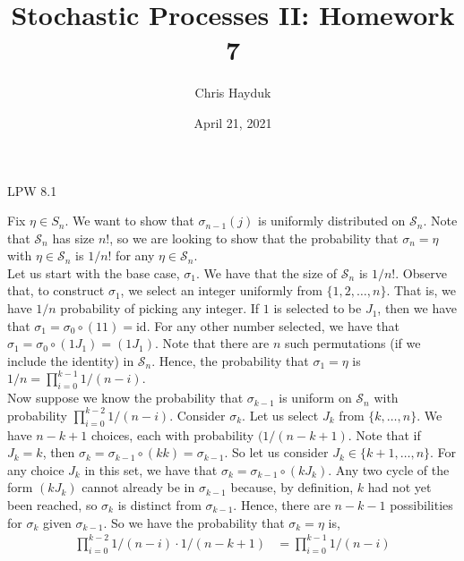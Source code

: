 \documentclass[12pt]{article}
\newenvironment{problem}[2][Problem]{\begin{trivlist}
\item[\hskip \labelsep {\bfseries #1}\hskip \labelsep {\bfseries #2.}]}{\end{trivlist}}
\begin{document}
\title{Stochastic Processes II: Homework 7}

\author{Chris Hayduk}
\date{April 21, 2021}

\maketitle

\begin{problem}{I}
LPW 8.1
\end{problem}


Fix $\eta \in S_n$. We want to show that $\sigma_{n-1}(j)$ is uniformly distributed on $\mathcal{S}_n$. Note that $\mathcal{S}_n$ has size $n!$, so we are looking to show that the probability that $\sigma_{n} = \eta$ with $\eta \in \mathcal{S}_n$ is $1/n!$ for any $\eta \in \mathcal{S}_n$.\\

Let us start with the base case, $\sigma_1$. We have that the size of $\mathcal{S}_n$ is $1/n!$. Observe that, to construct $\sigma_1$, we select an integer uniformly from $\{1, 2, \ldots, n\}$. That is, we have $1/n$ probability of picking any integer. If $1$ is selected to be $J_1$, then we have that $\sigma_1 = \sigma_0 \circ (11) = \text{id}$. For any other number selected, we have that $\sigma_1 = \sigma_0 \circ (1 J_1) = (1 J_1)$. Note that there are $n$ such permutations (if we include the identity) in $\mathcal{S}_n$. Hence, the probability that $\sigma_1 = \eta$ is $1/n = \prod_{i=0}^{k-1} 1/(n-i)$.\\

Now suppose we know the probability that $\sigma_{k-1}$ is uniform on $\mathcal{S}_{n}$ with probability $\prod_{i=0}^{k-2} 1/(n-i)$. Consider $\sigma_k$. Let us select $J_k$ from $\{k, \ldots, n\}$. We have $n-k+1$ choices, each with probability $(1/(n-k+1)$. Note that if $J_k = k$, then $\sigma_k = \sigma_{k-1} \circ (kk) = \sigma_{k-1}$. So let us consider $J_k \in \{k+1, \ldots, n\}$. For any choice $J_k$ in this set, we have that $\sigma_k = \sigma_{k-1} \circ (k J_k)$. Any two cycle of the form $(k J_k)$ cannot already be in $\sigma_{k-1}$ because, by definition, $k$ had not yet been reached, so $\sigma_k$ is distinct from $\sigma_{k-1}$. Hence, there are $n-k-1$ possibilities for $\sigma_k$ given $\sigma_{k-1}$. So we have the probability that $\sigma_k = \eta$ is,
\begin{align*}
\prod_{i=0}^{k-2} 1/(n-i) \cdot 1/(n-k+1) &= \prod_{i=0}^{k-1} 1/(n-i)
\end{align*}
\end{document}
